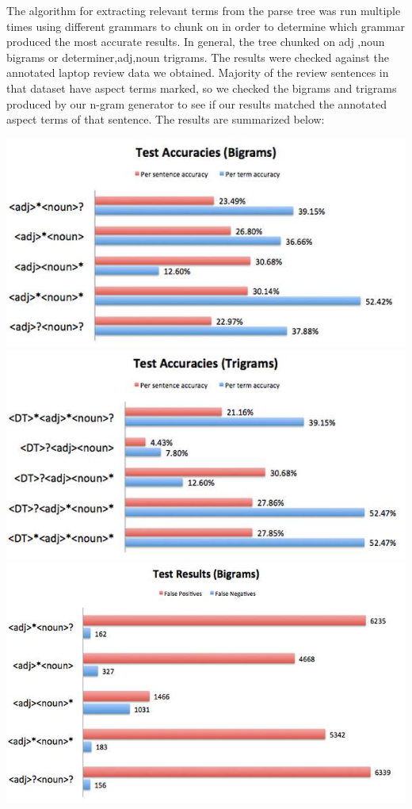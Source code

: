 \documentclass{article}
\begin{document}
The algorithm for extracting relevant terms from the parse tree was run multiple times using different grammars to chunk on in order to determine which grammar produced the most accurate results. In general, the tree chunked on adj ,noun bigrams or determiner,adj,noun trigrams. The results were checked against the annotated laptop review data we obtained. Majority of the review sentences in that dataset have aspect terms marked, so we checked the bigrams and trigrams produced by our n-gram generator to see if our results matched the annotated aspect terms of that sentence. The results are summarized below: 

\includegraphics[scale = 0.4]{bigramsAcc.jpg}
\includegraphics[scale = 0.4]{trigramsAcc.jpg}
\includegraphics[scale = 0.35]{bigramsFalse.jpg}
\end{document}
